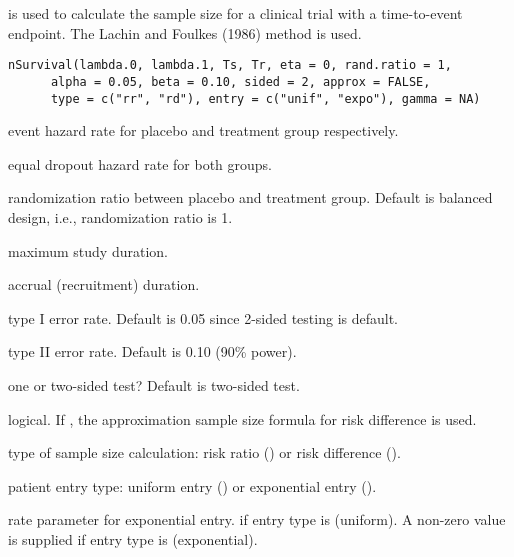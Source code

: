 \begin{Description}\relax
{} is used to calculate the sample size for a clinical trial with a time-to-event endpoint. The Lachin and Foulkes (1986) method is used.
\end{Description}
\begin{Usage}
\begin{verbatim}
nSurvival(lambda.0, lambda.1, Ts, Tr, eta = 0, rand.ratio = 1,
      alpha = 0.05, beta = 0.10, sided = 2, approx = FALSE,
      type = c("rr", "rd"), entry = c("unif", "expo"), gamma = NA)
\end{verbatim}
\end{Usage}
\begin{Arguments}
\begin{ldescription}
\item[\code{lambda.0, lambda.1}] event hazard rate for placebo and treatment
group respectively.
\item[\code{eta}] equal dropout hazard rate for both groups.
\item[\code{rand.ratio}] randomization ratio between placebo and treatment
group. Default is balanced design, i.e., randomization ratio is 1.
\item[\code{Ts}] maximum study duration.
\item[\code{Tr}] accrual (recruitment) duration.
\item[\code{alpha}] type I error rate. Default is 0.05 since 2-sided testing is default.
\item[\code{beta}] type II error rate. Default is 0.10 (90\% power).
\item[\code{sided}] one or two-sided test? Default is two-sided test.
\item[\code{approx}] logical. If , the approximation sample size
formula for risk difference is used.
\item[\code{type}] type of sample size calculation: risk ratio () or risk
difference ().
\item[\code{entry}] patient entry type: uniform entry () or exponential
entry ().
\item[\code{gamma}] rate parameter for exponential entry.  if entry type is
 (uniform). A non-zero value is supplied if entry type is
 (exponential).
\end{ldescription}
\end{Arguments}
